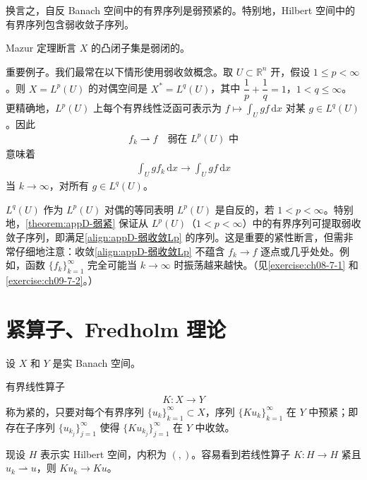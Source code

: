\documentclass[../main.tex]{subfiles}
\begin{document}
换言之，自反 Banach 空间中的有界序列是弱预紧的。特别地，Hilbert 空间中的有界序列包含弱收敛子序列。

Mazur 定理断言 $X$ 的凸闭子集是弱闭的。

\begin{remark}\label{remark:appD-弱收敛例子}
重要例子。我们最常在以下情形使用弱收敛概念。取 $U\subset\mathbb{R}^n$ 开，假设 $1\leqslant p<\infty$。则 $X=L^p(U)$ 的对偶空间是 $X^*=L^q(U)$，其中 $\dfrac{1}{p}+\dfrac{1}{q}=1$，$1<q\leqslant\infty$。更精确地，$L^p(U)$ 上每个有界线性泛函可表示为 $f\mapsto\int_U gf\,\mathrm{d}x$ 对某 $g\in L^q(U)$。因此
\begin{align*}
f_k\rightharpoonup f \quad \text{弱在 } L^p(U) \text{ 中}
\end{align*}
意味着
\begin{align}
\int_U gf_k\,\mathrm{d}x\to\int_U gf\,\mathrm{d}x
\label{align:appD-弱收敛Lp}
\end{align}
当 $k\to\infty$，对所有 $g\in L^q(U)$。

$L^q(U)$ 作为 $L^p(U)$ 对偶的等同表明 $L^p(U)$ 是自反的，若 $1<p<\infty$。特别地，\cref{theorem:appD-弱紧} 保证从 $L^p(U)$（$1<p<\infty$）中的有界序列可提取弱收敛子序列，即满足\eqref{align:appD-弱收敛Lp} 的序列。这是重要的紧性断言，但需非常仔细地注意：收敛\eqref{align:appD-弱收敛Lp} 不蕴含 $f_k\to f$ 逐点或几乎处处。例如，函数 $\{f_k\}_{k=1}^\infty$ 完全可能当 $k\to\infty$ 时振荡越来越快。（见\cref{exercise:ch08-7-1} 和\cref{exercise:ch09-7-2}。）
\end{remark}

\section{紧算子、Fredholm 理论}\label{section:appD-紧算子}

设 $X$ 和 $Y$ 是实 Banach 空间。

\begin{definition}\label{definition:appD-紧算子}
有界线性算子
\begin{align*}
K:X\to Y
\end{align*}
称为紧的，只要对每个有界序列 $\{u_k\}_{k=1}^\infty\subset X$，序列 $\{Ku_k\}_{k=1}^\infty$ 在 $Y$ 中预紧；即存在子序列 $\{u_{k_j}\}_{j=1}^\infty$ 使得 $\{Ku_{k_j}\}_{j=1}^\infty$ 在 $Y$ 中收敛。
\end{definition}

现设 $H$ 表示实 Hilbert 空间，内积为 $(,)$。容易看到若线性算子 $K:H\to H$ 紧且 $u_k\rightharpoonup u$，则 $Ku_k\to Ku$。
\end{document}

